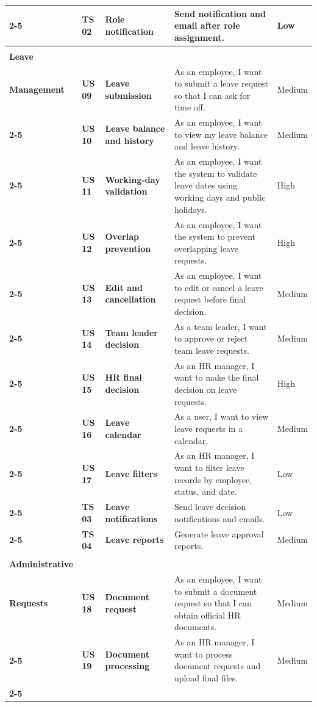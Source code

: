 \begin{longtable}{|>{\centering\bfseries}m{2.55cm}|>{\centering\bfseries}m{0.9cm}|>{\centering\bfseries}m{3.05cm}|m{6.75cm}|>{\centering\arraybackslash}m{1.45cm}|}
\cline{2-5}
& TS 02 & Role notification & Send notification and email after role assignment. & Low \\
\hline
\multirow{11}{=}{\centering\textbf{Sprint 2\\[4pt] Leave\\Management}}
& US 09 & Leave submission & As an employee, I want to submit a leave request so that I can ask for time off. & Medium \\
\cline{2-5}
& US 10 & Leave balance and history & As an employee, I want to view my leave balance and leave history. & Medium \\
\cline{2-5}
& US 11 & Working-day validation & As an employee, I want the system to validate leave dates using working days and public holidays. & High \\
\cline{2-5}
& US 12 & Overlap prevention & As an employee, I want the system to prevent overlapping leave requests. & High \\
\cline{2-5}
& US 13 & Edit and cancellation & As an employee, I want to edit or cancel a leave request before final decision. & Medium \\
\cline{2-5}
& US 14 & Team leader decision & As a team leader, I want to approve or reject team leave requests. & Medium \\
\cline{2-5}
& US 15 & HR final decision & As an HR manager, I want to make the final decision on leave requests. & High \\
\cline{2-5}
& US 16 & Leave calendar & As a user, I want to view leave requests in a calendar. & Medium \\
\cline{2-5}
& US 17 & Leave filters & As an HR manager, I want to filter leave records by employee, status, and date. & Low \\
\cline{2-5}
& TS 03 & Leave notifications & Send leave decision notifications and emails. & Low \\
\cline{2-5}
& TS 04 & Leave reports & Generate leave approval reports. & Medium \\
\hline
\multirow{11}{=}{\centering\textbf{Sprint 3\\[4pt] Administrative\\Requests}}
& US 18 & Document request & As an employee, I want to submit a document request so that I can obtain official HR documents. & Medium \\
\cline{2-5}
& US 19 & Document processing & As an HR manager, I want to process document requests and upload final files. & Medium \\
\cline{2-5}

\end{longtable}

